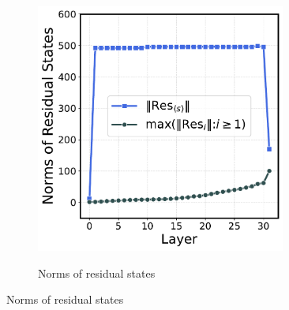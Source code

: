 \begin{figure}[t]
\begin{subfigure}[t]{0.3\textwidth}
      \label{fig:value_norms_zeroed}
  \end{subfigure}
  \hfill
  \begin{subfigure}[t]{0.3\textwidth}
      \centering 
      \caption{\small Norms of residual states}
      \includegraphics[width=0.9\textwidth]{Figures/demo_res_peak.pdf}
      \label{fig:token_norms_massive}
  \end{subfigure}
  

\end{figure}
